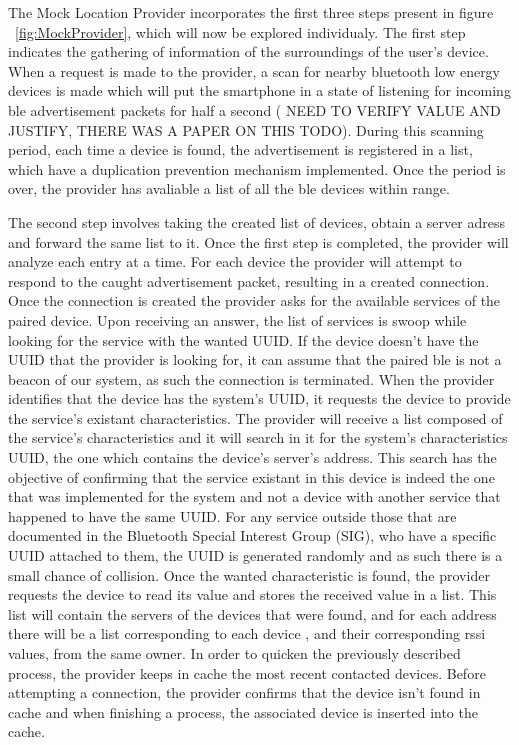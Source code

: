 \documentclass[a4paper]{IEEEtran}
\begin{document}
The Mock Location Provider incorporates the first three steps present in figure ~\ref{fig:MockProvider}, which will now be explored individualy. The first step indicates the gathering of information of the surroundings of the user's device. When a request is made to the provider, a scan for nearby bluetooth low energy devices is made which will put the smartphone in a state of listening for incoming ble advertisement packets for half a second ( NEED TO VERIFY VALUE AND JUSTIFY, THERE WAS A PAPER ON THIS TODO). During this scanning period, each time a device is found, the advertisement is registered in a list, which have a duplication prevention mechanism implemented. Once the period is over, the provider has avaliable a list of all the ble devices within range.   

The second step involves taking the created list of devices, obtain a server adress and forward the same list to it. Once the first step is completed, the provider will analyze each entry at a time. For each device the provider will attempt to respond to the caught advertisement packet, resulting in a created connection.  Once the connection is created the provider asks for the available services of the paired device. Upon receiving an answer, the list of services is swoop while looking for the service with the wanted UUID. If the device doesn't have the UUID that the provider is looking for, it can assume that the paired ble is not a beacon of our system, as such the connection is terminated. When the provider identifies that the device has the system's UUID, it requests the device to provide the service's existant characteristics. The provider will receive a list composed of the service's characteristics and it will search in it for the system's characteristics UUID, the one which contains the device's server's address. This search has the objective of confirming that the service existant in this device is indeed the one that was implemented for the system and not a device with another service that happened to have the same UUID. For any service outside those that are documented in the Bluetooth Special Interest Group (SIG), who have a specific UUID attached to them, the UUID is generated randomly and as such there is a small chance of collision. Once the wanted characteristic is found, the provider requests the device to read its value and stores the received value in a list. This list will contain the servers of the devices that were found, and for each address there will be a list corresponding to each device , and their corresponding rssi values, from the same owner. In order to quicken the previously described process, the provider keeps in cache the most recent contacted devices. Before attempting a connection, the provider confirms that the device isn't found in cache and when finishing a process, the associated device is inserted into the cache.
\end{document}

